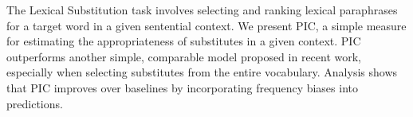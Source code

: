 The Lexical Substitution task involves selecting and ranking lexical paraphrases for a target word in a given sentential context. We present PIC, a simple measure for estimating the appropriateness of substitutes in a given context. PIC outperforms another simple, comparable model proposed in recent work, especially when selecting substitutes from the entire vocabulary. Analysis shows that PIC improves over baselines by incorporating frequency biases into predictions.
